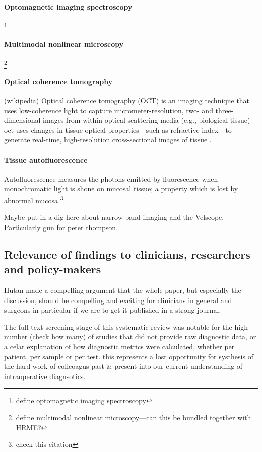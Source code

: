 \paragraph{Optomagnetic imaging spectroscopy} \cite{lisulb.PredictiveValueOptomagnetic2019}\footnote{define optomagnetic imaging spectroscopy} 
\paragraph{Multimodal nonlinear microscopy} \cite{heukes.MultimodalNonlinearMicroscopy2016}\footnote{define multimodal nonlinear microscopy---can this be bundled together with HRME?} 
\paragraph{Optical coherence tomography} (wikipedia) Optical coherence tomography (OCT) is an imaging technique that uses low-coherence light to capture micrometer-resolution, two- and three-dimensional images from within optical scattering media (e.g., biological tissue) \cite{hamdoonz.OpticalCoherenceTomography2016} \Gls{oct} uses changes in tissue optical properties---such as refractive index---to generate real-time, high-resolution cross-sectional images of tissue \cite{heidaria.e.UseOpticalCoherence2020}.
\paragraph{Tissue autofluorescence} \cite{ohnishiy.UsefulnessFluorescenceVisualization2016} Autofluorescence measures the photons emitted by fluorescence when monochromatic light is shone on mucosal tissue; a property which is lost by abnormal mucosa \cite{leey.-j.IntraoperativeFluorescenceGuidedSurgery2020}\footnote{check this citation}.

Maybe put in a dig here about narrow band imaging and the Velscope. 
Particularly gun for peter thompson.

\subsection{Relevance of findings to clinicians, researchers and policy-makers}

Hutan made a compelling argument that the whole paper, but especially the discussion, should be compelling and exciting for clinicians in general and surgeons in particular if we are to get it published in a strong journal.

The full text screening stage of this systematic review was notable for the high number (check how many) of studies that did not provide raw diagnostic data, or a celar explanation of how diagnostic metrics were calculated, whether per patient, per sample or per test.
this represents a lost opportunity for systhesis of the hard work of colleoagus past \& present into our current understanding of intraoperative diagnsotics.

